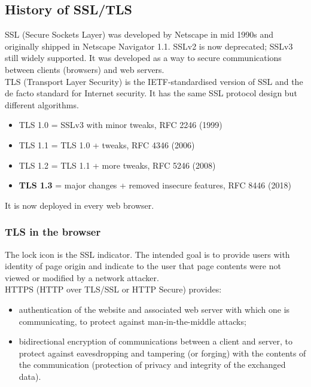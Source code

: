 \documentclass[a4paper, 10pt, titlepage]{article}
\begin{document}
\subsection{History of SSL/TLS}
SSL (Secure Sockets Layer) was developed by Netscape in mid 1990s and originally shipped in Netscape Navigator 1.1. SSLv2 is now deprecated; SSLv3 still widely supported. It was developed as a way to secure communications between clients (browsers) and web servers. \medskip\\
TLS (Transport Layer Security) is the IETF-standardised version of SSL and the de facto standard for Internet security.
It has the same SSL protocol design but different algorithms. 
\begin{itemize}
\item TLS 1.0 = SSLv3 with minor tweaks, RFC 2246 (1999)
\item TLS 1.1 = TLS 1.0 + tweaks, RFC 4346 (2006)
\item TLS 1.2 = TLS 1.1 + more tweaks, RFC 5246 (2008)
\item \textbf{TLS 1.3} = major changes + removed insecure features, RFC 8446 (2018)
\end{itemize}
It is now deployed in every web browser.

\subsubsection{TLS in the browser}
The lock icon is the SSL indicator. The intended goal is to provide users with identity of page origin and indicate to the user that page contents were not viewed or modified by a network attacker.\medskip\\
HTTPS (HTTP over TLS/SSL or HTTP Secure) provides:
\begin{itemize}
\item authentication of the website and associated web server with which one is communicating, to protect against man-in-the-middle attacks;
\item bidirectional encryption of communications between a client and server, to protect against eavesdropping and tampering (or forging) with the contents of the communication (protection of privacy and integrity of the exchanged data).
\end{itemize}
\end{document}
